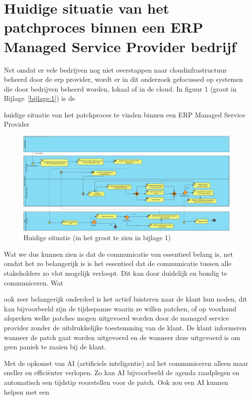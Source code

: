\section{Huidige situatie van het patchproces binnen een ERP Managed Service Provider bedrijf}

Net omdat er vele bedrijven nog niet overstappen naar cloudinfrastructuur beheerd door de erp provider, wordt er in dit onderzoek gefocussed op systemen die door bedrijven beheerd worden, lokaal of in de cloud. In figuur 1 (groot in Bijlage~\ref{bijlage:1}) is de 

huidige situatie van het patchproces te vinden binnen een ERP Managed Service Provider \\

\begin{figure}[h]
    \centering
    \includegraphics[width=\textwidth]{huidigesituatie.jpg}
    \caption{Huidige situatie (in het groot te zien in bijlage 1)}
    \label{fig:huidigesituatie}
\end{figure}
\newpage

Wat we dus kunnen zien is dat de communicatie van essentieel belang is, net omdat het zo belangerijk is is het essentieel dat de communicatie tussen alle stakeholders zo vlot mogelijk verloopt. Dit kan door duidelijk en bondig te communiceren. Wat 

ook zeer belangerijk onderdeel is het actief luisteren naar de klant hun noden, dit kan bijvoorbeeld zijn de tijdsspanne waarin ze willen patchen, of op voorhand afspreken
 welke patches mogen uitgevoerd worden door de managed service provider zonder de uitdrukkelijke toestemming van de klant. De klant informeren wanneer de patch gaat worden uitgevoerd en de wanneer deze uitgevoerd is om geen paniek te zaaien bij de klant. 

Met de opkomst van AI (artificiele inteligentie) zal het communiceren alleen maar sneller en efficiënter verlopen. Zo kan AI bijvoorbeeld de agenda raadplegen en automatisch een tijdstip voorstellen voor de patch. Ook zou een AI kunnen helpen met een 

